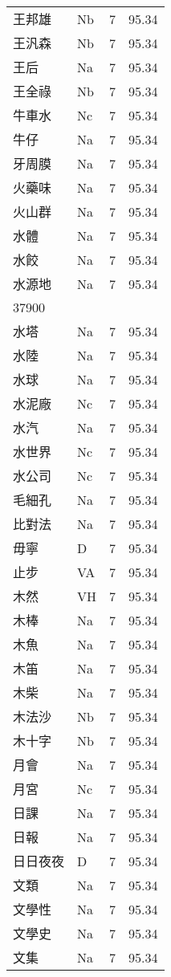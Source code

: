 \documentclass[twocolumn]{book}
\begin{document}
\begin{supertabular}{llrr}
王邦雄 & Nb & 7 &  95.34\\
王汎森 & Nb & 7 &  95.34\\
王后 & Na & 7 &  95.34\\
王全祿 & Nb & 7 &  95.34\\
牛車水 & Nc & 7 &  95.34\\
牛仔 & Na & 7 &  95.34\\
牙周膜 & Na & 7 &  95.34\\
火藥味 & Na & 7 &  95.34\\
火山群 & Na & 7 &  95.34\\
水體 & Na & 7 &  95.34\\
水餃 & Na & 7 &  95.34\\
水源地 & Na & 7 &  95.34\\
37900\\
水塔 & Na & 7 &  95.34\\
水陸 & Na & 7 &  95.34\\
水球 & Na & 7 &  95.34\\
水泥廠 & Nc & 7 &  95.34\\
水汽 & Na & 7 &  95.34\\
水世界 & Nc & 7 &  95.34\\
水公司 & Nc & 7 &  95.34\\
毛細孔 & Na & 7 &  95.34\\
比對法 & Na & 7 &  95.34\\
毋寧 & D & 7 &  95.34\\
止步 & VA & 7 &  95.34\\
木然 & VH & 7 &  95.34\\
木棒 & Na & 7 &  95.34\\
木魚 & Na & 7 &  95.34\\
木笛 & Na & 7 &  95.34\\
木柴 & Na & 7 &  95.34\\
木法沙 & Nb & 7 &  95.34\\
木十字 & Nb & 7 &  95.34\\
月會 & Na & 7 &  95.34\\
月宮 & Nc & 7 &  95.34\\
日課 & Na & 7 &  95.34\\
日報 & Na & 7 &  95.34\\
日日夜夜 & D & 7 &  95.34\\
文類 & Na & 7 &  95.34\\
文學性 & Na & 7 &  95.34\\
文學史 & Na & 7 &  95.34\\
文集 & Na & 7 &  95.34\\

\end{supertabular}
\end{document}
